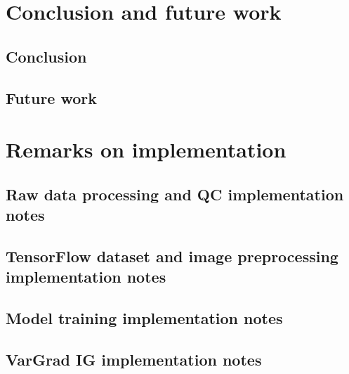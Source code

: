 \documentclass[biblatexBackend=bibtex]{tumthesis}
\begin{document}
\chapter{Conclusion and future work}

\section{Conclusion}


\section{Future work}


\appendix

\chapter{Remarks on implementation}
\label{Appendix-Implementation}


\section{Raw data processing and QC implementation notes}
\label{sec:appendix:raw_data}


\section{TensorFlow dataset and image preprocessing implementation notes}
\label{sec:appendix:tfds}


\section{Model training implementation notes}
\label{sec:appendix:Model_training_IN}


\section{VarGrad IG implementation notes}
\label{sec:appendix:VarGrad_IG_Experimental_Setup}

\end{document}

